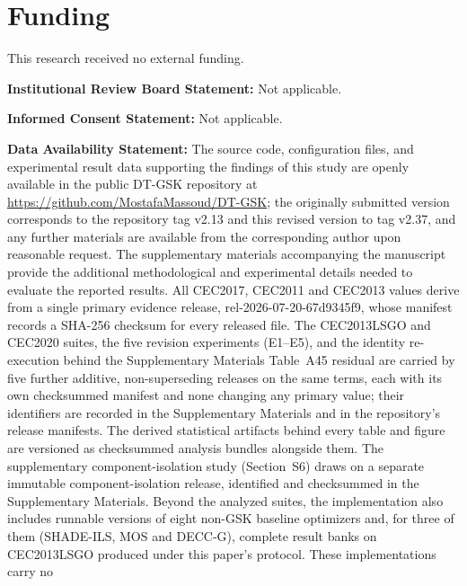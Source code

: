 \documentclass[10pt,a4paper]{article}
\newcommand{\dtgsk}{DT-GSK}
\begin{document}
\section*{Funding}

This research received no external funding.


\vspace{1em}
\noindent\textbf{Institutional Review Board Statement:} Not applicable.

\vspace{1em}
\noindent\textbf{Informed Consent Statement:} Not applicable.

\vspace{1em}






\noindent\textbf{Data Availability Statement:} The source code,
configuration files, and experimental result data supporting the findings of
this study are openly available in the public \dtgsk{} repository at
\url{https://github.com/MostafaMassoud/DT-GSK}; the originally submitted
version corresponds to the repository tag v2.13 and this revised version to
tag v2.37, and any further materials are
available from the corresponding author upon reasonable request. The
supplementary materials accompanying the manuscript provide the additional
methodological and experimental details needed to evaluate the reported
results.
All CEC2017, CEC2011 and CEC2013 values derive from a single primary
evidence release, rel-2026-07-20-67d9345f9, whose manifest records a
SHA-256 checksum for every released file. The CEC2013LSGO and CEC2020
suites, the five revision experiments (E1--E5), and the identity
re-execution behind the Supplementary Materials Table~A45 residual are
carried by five further additive, non-superseding releases on the same
terms, each with its own checksummed manifest and none changing any
primary value; their identifiers are recorded in the Supplementary
Materials and in the repository's release manifests. The derived
statistical artifacts behind every table and figure are versioned as
checksummed analysis bundles alongside them. The supplementary component-isolation study
(Section~S6) draws on a separate immutable component-isolation release,
identified and checksummed in the Supplementary Materials. 
Beyond the analyzed suites, the implementation also includes runnable
versions of eight non-GSK baseline optimizers and, for three of
them (SHADE-ILS, MOS and DECC-G), complete result banks on CEC2013LSGO
produced under this paper's protocol. These implementations carry no
\end{document}
